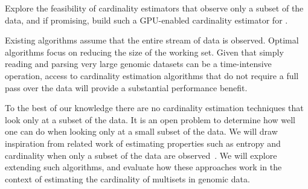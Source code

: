 \begin{rproblem}
Explore the feasibility of cardinality estimators that observe only a  subset of the data, and if promising, build such a GPU-enabled cardinality estimator for \kmers.
\end{rproblem}

Existing algorithms assume that the entire stream of data is observed.  Optimal algorithms focus on reducing the size of the working set.  Given that simply reading and parsing very large genomic datasets can be a time-intensive operation, access to cardinality estimation algorithms that do not require a full pass over the data will provide a substantial performance benefit.

To the best of our knowledge there are no cardinality estimation techniques that look only at a subset of the data.   It is an open problem to determine how well one can do when looking only at a small subset of the data. We will draw inspiration from related work of estimating properties such as entropy and cardinality when only a subset of the data are observed~\cite{valiant2017estimating}.  We will explore extending such algorithms, and evaluate how these approaches work in the context of estimating the cardinality of \kmer multisets in genomic data.  
